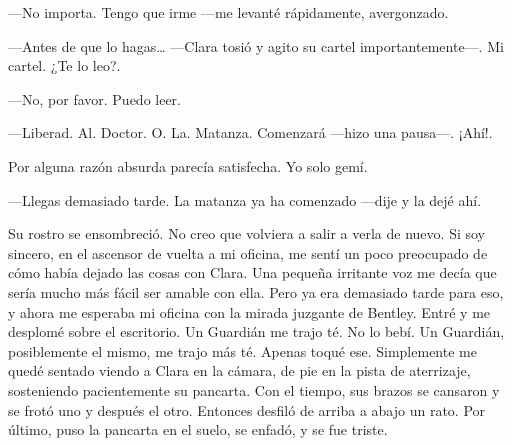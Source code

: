 ---No importa. Tengo que irme ---me levanté rápidamente, avergonzado.

---Antes de que lo hagas\ldots{} ---Clara tosió y agito su cartel
importantemente---. Mi cartel. ¿Te lo leo?.

---No, por favor. Puedo leer.

---Liberad. Al. Doctor. O. La. Matanza. Comenzará ---hizo una pausa---.
¡Ahí!.

Por alguna razón absurda parecía satisfecha. Yo solo gemí.

---Llegas demasiado tarde. La matanza ya ha comenzado ---dije y la dejé
ahí.

Su rostro se ensombreció. No creo que volviera a salir a verla de nuevo.
Si soy sincero, en el ascensor de vuelta a mi oficina, me sentí un poco
preocupado de cómo había dejado las cosas con Clara. Una pequeña
irritante voz me decía que sería mucho más fácil ser amable con ella.
Pero ya era demasiado tarde para eso, y ahora me esperaba mi oficina con
la mirada juzgante de Bentley. Entré y me desplomé sobre el escritorio.
Un Guardián me trajo té. No lo bebí. Un Guardián, posiblemente el mismo,
me trajo más té. Apenas toqué ese. Simplemente me quedé sentado viendo a
Clara en la cámara, de pie en la pista de aterrizaje, sosteniendo
pacientemente su pancarta. Con el tiempo, sus brazos se cansaron y se
frotó uno y después el otro. Entonces desfiló de arriba a abajo un rato.
Por último, puso la pancarta en el suelo, se enfadó, y se fue triste.